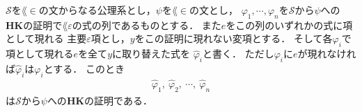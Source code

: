 	\begin{screen}
		\begin{metathm}
		\label{metathm:Henkin_expansion_2_lemma}
			$\mathscr{S}$を$\lang{\in}$の文からなる公理系とし，$\psi$を$\lang{\in}$の文とし，
			$\varphi_{1},\cdots,\varphi_{n}$を$\mathscr{S}$から$\psi$への
			{\bf HK}の証明で$\lang{\varepsilon}$の式の列であるものとする．
			また$e$をこの列のいずれかの式に項として現れる\footnotemark
			主要$\varepsilon$項とし，$y$をこの証明に現れない変項とする．
			そして各$\varphi_{i}$で項として現れる$e$を全て$y$に取り替えた式を
			$\widehat{\varphi}_{i}$と書く．
			ただし$\varphi_{i}$に$e$が現れなければ$\widehat{\varphi}_{i}$は$\varphi_{i}$とする．
			このとき
			\begin{align}
				\widehat{\varphi}_{1},\ \widehat{\varphi}_{2},\ 
				\cdots,\ \widehat{\varphi}_{n}
			\end{align}
			は$\mathscr{S}$から$\psi$への{\bf HK}の証明である．
		\end{metathm}
	\end{screen}
	
	
